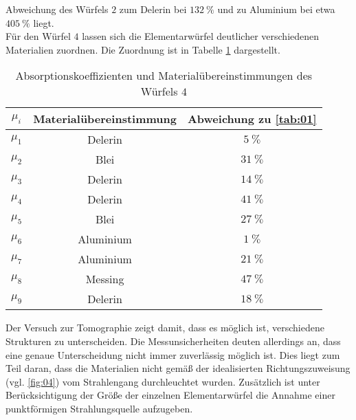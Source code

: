 Abweichung des Würfels $2$ zum Delerin bei $\SI{132}{\percent}$ und zu Aluminium
bei etwa $\SI{405}{\percent}$ liegt.  \\
\noindent Für den Würfel $4$ lassen sich die Elementarwürfel deutlicher
verschiedenen Materialien zuordnen. Die Zuordnung ist in Tabelle \ref{tab:02}
dargestellt.
\FloatBarrier
\begin{table}
  \centering
  \caption{Absorptionskoeffizienten und Materialübereinstimmungen des Würfels $4$}
  \label{tab:02}
  \begin{tabular}{c c c}
    \toprule
   \multicolumn{1}{c}{$\mu_i$} & \multicolumn{1}{c}{Materialübereinstimmung }
   & \multicolumn{1}{c}{Abweichung zu \ref{tab:01}}  \\
   \midrule
    $\mu_1$ & Delerin &   $\SI{5}{\percent} $\\
    $\mu_2$ & Blei &      $\SI{31}{\percent}$ \\
    $\mu_3$ & Delerin &   $\SI{14}{\percent}$ \\
    $\mu_4$ & Delerin &   $\SI{41}{\percent}$ \\
    $\mu_5$ & Blei &      $\SI{27}{\percent}$ \\
    $\mu_6$ & Aluminium & $\SI{1}{\percent} $\\
    $\mu_7$ & Aluminium & $\SI{21}{\percent}$ \\
    $\mu_8$ & Messing &   $\SI{47}{\percent}$ \\
    $\mu_9$ & Delerin &   $\SI{18}{\percent}$ \\
\bottomrule
  \end{tabular}
\end{table}
\newpage
\FloatBarrier
\noindent Der Versuch zur Tomographie zeigt damit, dass es möglich ist,
verschiedene Strukturen zu unterscheiden. Die Messunsicherheiten deuten allerdings
an, dass eine genaue Unterscheidung nicht immer zuverlässig möglich ist. Dies
liegt zum Teil daran, dass die Materialien nicht gemäß der idealisierten
Richtungszuweisung (vgl. \ref{fig:04}) vom Strahlengang durchleuchtet wurden.
Zusätzlich ist unter Berücksichtigung der Größe der einzelnen Elementarwürfel
die Annahme einer punktförmigen Strahlungsquelle aufzugeben.
